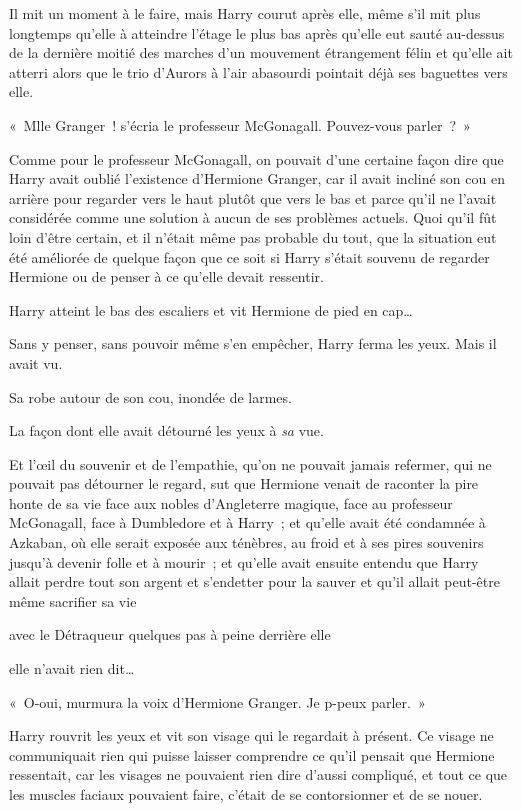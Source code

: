 Il mit un moment à le faire, mais Harry courut après elle, même s'il mit plus longtemps qu'elle à atteindre l'étage le plus bas après qu'elle eut sauté au-dessus de la dernière moitié des marches d'un mouvement étrangement félin et qu'elle ait atterri alors que le trio d'Aurors à l'air abasourdi pointait déjà ses baguettes vers elle.

«~Mlle Granger~! s'écria le professeur McGonagall. Pouvez-vous parler~?~»

Comme pour le professeur McGonagall, on pouvait d'une certaine façon dire que Harry avait oublié l'existence d'Hermione Granger, car il avait incliné son cou en arrière pour regarder vers le haut plutôt que vers le bas et parce qu'il ne l'avait considérée comme une solution à aucun de ses problèmes actuels. Quoi qu'il fût loin d'être certain, et il n'était même pas probable du tout, que la situation eut été améliorée de quelque façon que ce soit si Harry s'était souvenu de regarder Hermione ou de penser à ce qu'elle devait ressentir.

Harry atteint le bas des escaliers et vit Hermione de pied en cap…

Sans y penser, sans pouvoir même s'en empêcher, Harry ferma les yeux. Mais il avait vu.

Sa robe autour de son cou, inondée de larmes.

La façon dont elle avait détourné les yeux à \emph{sa} vue.

Et l'œil du souvenir et de l'empathie, qu'on ne pouvait jamais refermer, qui ne pouvait pas détourner le regard, sut que Hermione venait de raconter la pire honte de sa vie face aux nobles d'Angleterre magique, face au professeur McGonagall, face à Dumbledore et à Harry~; et qu'elle avait été condamnée à Azkaban, où elle serait exposée aux ténèbres, au froid et à ses pires souvenirs jusqu'à devenir folle et à mourir~; et qu'elle avait ensuite entendu que Harry allait perdre tout son argent et s'endetter pour la sauver et qu'il allait peut-être même sacrifier sa vie

avec le Détraqueur quelques pas à peine derrière elle

elle n'avait rien dit…

«~O-oui, murmura la voix d'Hermione Granger. Je p-peux parler.~»

Harry rouvrit les yeux et vit son visage qui le regardait à présent. Ce visage ne communiquait rien qui puisse laisser comprendre ce qu'il pensait que Hermione ressentait, car les visages ne pouvaient rien dire d'aussi compliqué, et tout ce que les muscles faciaux pouvaient faire, c'était de se contorsionner et de se nouer.

